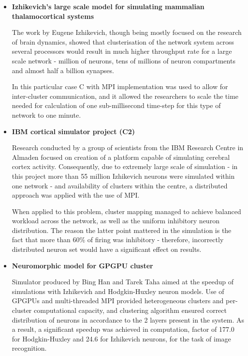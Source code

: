 \begin{itemize}
\item{\textbf{Izhikevich's large scale model for simulating mammalian thalamocortical systems}}

The work by Eugene Izhikevich, though being mostly focused on the research of brain dynamics, showed that clusterisation of the network system across several processors would result in much higher throughput rate for a large scale network - million of neurons, tens of millions of neuron compartments and almost half a billion synapses.

In this particular case C with MPI implementation was used to allow for inter-cluster communication, and it allowed the researchers to scale the time needed for calculation of one sub-millisecond time-step for this type of network to one minute.\cite{EugeneM.Izhikevich2008}

\item{\textbf{IBM cortical simulator project (C2)}}

Research conducted by a group of scientists from the IBM Research Centre in Almaden focused on creation of a platform capable of simulating cerebral cortex activity. Consequently, due to extremely large scale of simulation - in this project more than 55 million Izhikevich neurons were simulated within one network - and availability of clusters within the centre, a distributed approach was applied with the use of MPI.

When applied to this problem, cluster mapping managed to achieve balanced workload across the network, as well as the uniform inhibitory neuron distribution. The reason the latter point mattered in the simulation is the fact that more than 60\% of firing was inhibitory - therefore, incorrectly distributed neuron set would have a significant effect on results.\cite{DharmendraS.Modha2007}

\item{\textbf{Neuromorphic model for GPGPU cluster}}

Simulator produced by Bing Han and Tarek Taha aimed at the speedup of simulations with Izhikevich and Hodgkin-Huxley neuron models. Use of GPGPUs and multi-threaded MPI provided heterogeneous  clusters and per-cluster computational capacity, and clustering algorithm ensured correct distribution of neurons in accordance to the 2 layers present in the system. As a result, a significant speedup was achieved in computation, factor of 177.0 for Hodgkin-Huxley and 24.6 for Izhikevich neurons, for the task of image recognition.\cite{TarekM.Taha2010}
\end{itemize}
